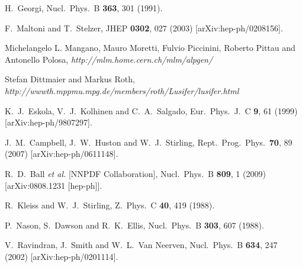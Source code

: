 \documentclass[12pt]{article}
\begin{document}
\begin{thebibliography}{99}
%
H.~Georgi,
Nucl.\ Phys.\ B {\bf 363}, 301 (1991).

F.~Maltoni and T.~Stelzer,
JHEP {\bf 0302}, 027 (2003)
[arXiv:hep-ph/0208156].

Michelangelo L. Mangano, Mauro Moretti, Fulvio Piccinini, Roberto Pittau and Antonello Polosa, {\it http://mlm.home.cern.ch/mlm/alpgen/}

Stefan Dittmaier and Markus Roth,\\
{\it http://wwwth.mppmu.mpg.de/members/roth/Lusifer/lusifer.html}

  K.~J.~Eskola, V.~J.~Kolhinen and C.~A.~Salgado,
  Eur.\ Phys.\ J.\ C {\bf 9}, 61 (1999)
  [arXiv:hep-ph/9807297].
  
  J.~M.~Campbell, J.~W.~Huston and W.~J.~Stirling,
  Rept.\ Prog.\ Phys.\  {\bf 70}, 89 (2007)
  [arXiv:hep-ph/0611148].

  R.~D.~Ball {\it et al.}  [NNPDF Collaboration],
  Nucl.\ Phys.\  B {\bf 809}, 1 (2009)
  [arXiv:0808.1231 [hep-ph]].

R.~Kleiss and W.~J.~Stirling,
Z.\ Phys.\ C {\bf 40}, 419 (1988).

P.~Nason, S.~Dawson and R.~K.~Ellis,
Nucl.\ Phys.\ B {\bf 303}, 607 (1988).

V.~Ravindran, J.~Smith and W.~L.~Van Neerven,
Nucl.\ Phys.\ B {\bf 634}, 247 (2002)
[arXiv:hep-ph/0201114].


\end{thebibliography}
\end{document}
